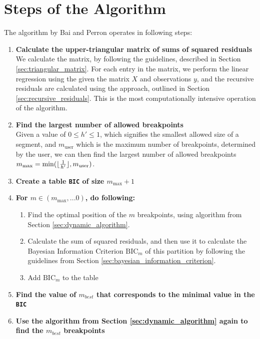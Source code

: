 \documentclass[main.tex]{subfiles}
\begin{document}
\section{Steps of the Algorithm}
\label{sec:steps_of_the_algorithm}
The algorithm by Bai and Perron operates in following steps:
\begin{enumerate}
\item \textbf{Calculate the upper-triangular matrix of sums of squared residuals}\\
  We calculate the matrix, by following the guidelines, described in Section \ref{sec:triangular_matrix}.
  For each entry in the matrix, we perform the linear regression using the given the matrix
  $X$ and observations $y$, and the recursive residuals are calculated
  using the approach, outlined in Section \ref{sec:recursive_residuals}. This is
  the most computationally intensive operation of the algorithm.
\item \textbf{Find the largest number of allowed breakpoints}\\
  Given a value of $0\leq h' \leq 1$, which signifies the smallest allowed size of
  a segment, and $m_{\text{user}}$ which is the maximum number of breakpoints, determined by the user, 
  we can then find the largest number of allowed
  breakpoints $m_{\text{max}} = \min(\lfloor\frac{1}{h'}\rfloor, m_{\text{user}})$.
\item \textbf{Create a table \texttt{BIC} of size $m_{\text{max}} + 1$}
\item \textbf{For $m \in (m_{\text{max}}, ... 0)$, do following:}
  \begin{enumerate}[1)]
  \item Find the optimal position of the $m$ breakpoints, using algorithm
    from Section \ref{sec:dynamic_algorithm}.
  \item Calculate the sum of squared residuals, and then use it to
    calculate the Bayesian Information Criterion $\text{BIC}_m$ of this
    partition by following the guidelines from Section
    \ref{sec:bayesian_information_criterion}.
  \item Add $\text{BIC}_m$ to the table
  \end{enumerate}
\item \textbf{Find the value of $m_{best}$ that corresponds to the minimal value in the \texttt{BIC}}
\item \textbf{Use the algorithm from Section \ref{sec:dynamic_algorithm} again to find the $m_{best}$ breakpoints}
\end{enumerate}
\end{document}
